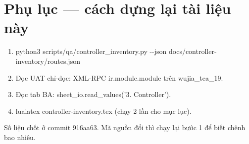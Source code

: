 \documentclass[11pt,a4paper]{report}
\newcommand{\rt}[1]{{\ttfamily\footnotesize #1}}
\begin{document}
\chapter{Phụ lục --- cách dựng lại tài liệu này}

\begin{enumerate}[leftmargin=*]
  \item \rt{python3 scripts/qa/controller\_inventory.py -{}-json docs/controller-inventory/routes.json}
  \item Đọc UAT chỉ-đọc: XML-RPC \rt{ir.module.module} trên \rt{wujia\_tea\_19}.
  \item Đọc tab BA: \rt{sheet\_io.read\_values('3. Controller')}.
  \item \rt{lualatex controller-inventory.tex} (chạy 2 lần cho mục lục).
\end{enumerate}

Số liệu chốt ở commit \rt{916aa63}. Mã nguồn đổi thì chạy lại bước 1 để biết chênh bao nhiêu.
\end{document}

